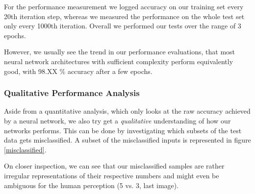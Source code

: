 \documentclass{article}
\begin{document}
For the performance measurement we logged accuracy on our training set every 20th iteration step, whereas we measured the performance on the whole test set only every 1000th iteration. Overall we performed our tests over the range of 3 epochs. 

However, we usually see the trend in our performance evaluations, that most neural network architectures with sufficient complexity perform equivalently good, with 98.XX \% accuracy after a few epochs.

\subsubsection{Qualitative Performance Analysis}

Aside from a quantitative analysis, which only looks at the raw accuracy achieved by a neural network, we also try get a \textit{qualitative} understanding of how our networks performs. This can be done by investigating which subsets of the test data gets misclassified. A subset of the misclassified inputs is represented in figure \ref{misclassified}.

On closer inspection, we can see that our misclassified samples are rather irregular representations of their respective numbers and might even be ambiguous for the human perception (5 vs. 3, last image).
\end{document}
